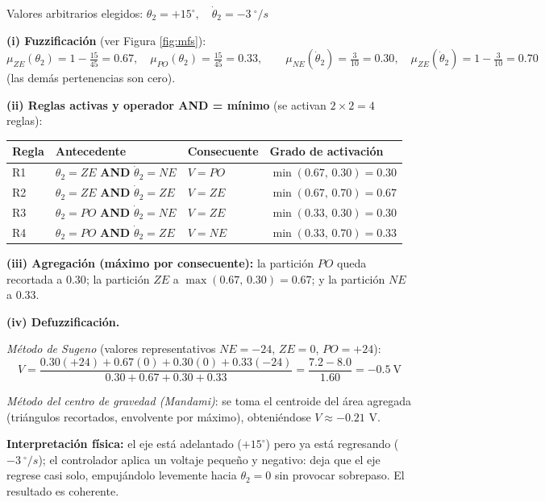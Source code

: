\documentclass[11pt,a4paper]{article}
\newcommand{\grados}{^{\circ}}
\begin{document}
Valores arbitrarios elegidos: $\boxed{\theta_2=+15\grados,\quad \dot\theta_2=-3\ \grados/s}$

\textbf{(i) Fuzzificación} (ver Figura \ref{fig:mfs}):
\[
\mu_{ZE}(\theta_2)=1-\tfrac{15}{45}=0.67,\quad
\mu_{PO}(\theta_2)=\tfrac{15}{45}=0.33,\qquad
\mu_{NE}(\dot\theta_2)=\tfrac{3}{10}=0.30,\quad
\mu_{ZE}(\dot\theta_2)=1-\tfrac{3}{10}=0.70
\]
(las demás pertenencias son cero).

\textbf{(ii) Reglas activas y operador AND = mínimo} (se activan $2\times 2=4$ reglas):
\begin{center}
\begin{tabular}{llll}
\toprule
Regla & Antecedente & Consecuente & Grado de activación\\
\midrule
R1 & $\theta_2=ZE$ \textbf{AND} $\dot\theta_2=NE$ & $V=PO$ & $\min(0.67,\,0.30)=0.30$\\
R2 & $\theta_2=ZE$ \textbf{AND} $\dot\theta_2=ZE$ & $V=ZE$ & $\min(0.67,\,0.70)=0.67$\\
R3 & $\theta_2=PO$ \textbf{AND} $\dot\theta_2=NE$ & $V=ZE$ & $\min(0.33,\,0.30)=0.30$\\
R4 & $\theta_2=PO$ \textbf{AND} $\dot\theta_2=ZE$ & $V=NE$ & $\min(0.33,\,0.70)=0.33$\\
\bottomrule
\end{tabular}
\end{center}

\textbf{(iii) Agregación (máximo por consecuente):} la partición $PO$ queda recortada a $0.30$; la partición $ZE$ a $\max(0.67,\,0.30)=0.67$; y la partición $NE$ a $0.33$.

\textbf{(iv) Defuzzificación.}

\emph{Método de Sugeno} (valores representativos $NE=-24$, $ZE=0$, $PO=+24$):
\[
V=\frac{0.30(+24)+0.67(0)+0.30(0)+0.33(-24)}{0.30+0.67+0.30+0.33}
=\frac{7.2-8.0}{1.60}
=\boxed{-0.5\ \mathrm{V}}
\]

\emph{Método del centro de gravedad (Mandami)}: se toma el centroide del área agregada (triángulos recortados, envolvente por máximo), obteniéndose $V\approx -0.21$ V.

\textbf{Interpretación física:} el eje está adelantado ($+15\grados$) pero ya está regresando ($-3\ \grados/s$); el controlador aplica un voltaje pequeño y negativo: deja que el eje regrese casi solo, empujándolo levemente hacia $\theta_2=0$ sin provocar sobrepaso. El resultado es coherente.
\end{document}
